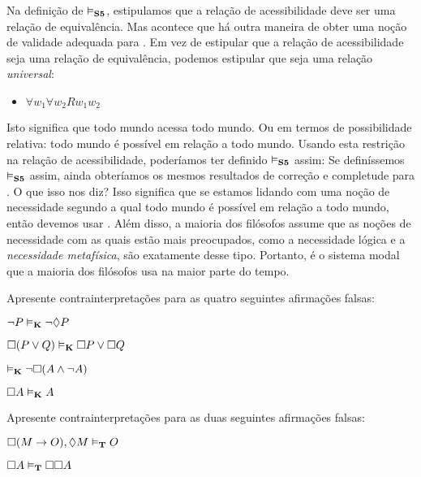 Na definição de  $\vDash_{\mathbf{S5}} $, estipulamos que a relação de acessibilidade deve ser uma relação de equivalência. Mas acontece que há outra maneira de obter uma noção de validade adequada para \mlSfive. Em vez de estipular que a relação de acessibilidade seja uma relação de equivalência, podemos estipular que seja uma relação \emph{universal}:
\begin{itemize}
	\item $\forall w_1\forall w_2Rw_1w_2$
\end{itemize}
Isto significa  que todo mundo acessa todo mundo. Ou em termos de possibilidade relativa: todo mundo é possível em relação a todo mundo. Usando esta restrição na relação de acessibilidade, poderíamos ter definido  $\vDash_{\mathbf{S5}} $ assim:
Se definíssemos $\vDash_{\mathbf{S5}} $ assim, ainda obteríamos os mesmos resultados de correção e completude para \mlSfive{}. O que isso nos diz? Isso significa que se estamos lidando com uma noção de necessidade segundo a qual todo mundo é possível em relação a todo mundo, então devemos usar \mlSfive{}. Além disso, a maioria dos filósofos assume que as noções de necessidade com as quais estão mais preocupados, como a necessidade lógica e a \emph{necessidade metafísica}, são exatamente desse tipo. Portanto, \mlSfive{} é o sistema modal que a maioria dos filósofos usa na maior parte do tempo.
 

\practiceproblems

\problempart
Apresente contrainterpretações para as quatro seguintes afirmações falsas:
\begin{earg}
	\item $\neg P \vDash_{\mathbf{K}} \neg\Diamond P$
	\item $\Box(P \vee Q)\vDash_{\mathbf{K}} \Box P \vee \Box Q$
	\item $\vDash_{\mathbf{K}} \neg \Box (A\wedge \neg A)$
	\item $\Box A\vDash_{\mathbf{K}} A$
\end{earg}

\problempart
Apresente contrainterpretações para as duas seguintes afirmações falsas:
\begin{earg}
	\item $\Box (M\rightarrow O),\Diamond M\vDash_{\mathbf{T}} O$
	\item $\Box A\vDash_{\mathbf{T}} \Box \Box A$
\end{earg}

